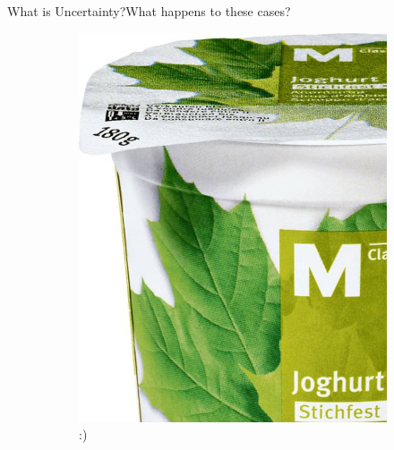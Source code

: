 \documentclass{beamer}
\begin{document}
\begin{frame}{What is Uncertainty?}{What happens to these cases?}
\begin{figure}[H]
\begin{subfigure}{.32\textwidth}
		\includegraphics[width=\textwidth]{m-classic-joghurt-ahornsirup-stichfest-zoom2}
		\pause
		:)
	\end{subfigure}\pause
	\begin{subfigure}{.32\textwidth}
		\centering

\end{subfigure}
\end{figure}
\end{frame}
\end{document}
